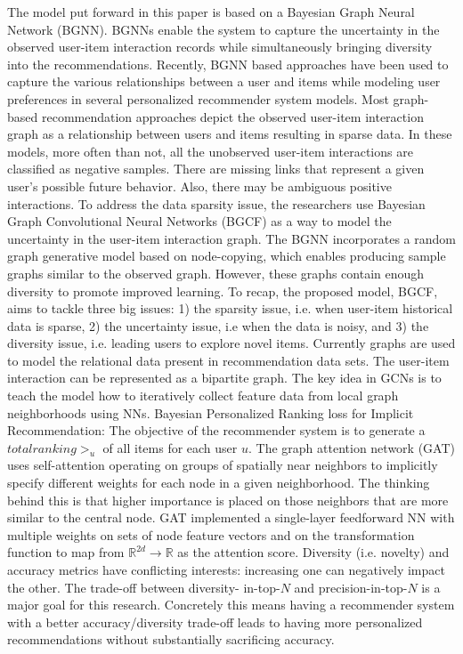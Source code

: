 The model put forward in this paper is based on a Bayesian Graph Neural Network (BGNN). BGNNs enable the system to capture the uncertainty in the observed user-item interaction records while simultaneously bringing diversity into the recommendations.  Recently, BGNN based approaches have been used to capture the various relationships between a user and items while modeling user preferences in several personalized recommender system models. Most graph-based recommendation approaches depict the observed user-item interaction graph as a relationship between users and items resulting in sparse data. In these models, more often than not, all the unobserved user-item interactions are classified as negative samples. There are missing links that represent a given user’s possible future behavior. Also, there may be ambiguous positive interactions. To address the data sparsity issue, the researchers use Bayesian Graph Convolutional Neural Networks (BGCF) as a way to model the uncertainty in the user-item interaction graph. The BGNN incorporates a random graph generative model based on node-copying, which enables producing sample graphs similar to the observed graph. However, these graphs contain enough diversity to promote improved learning. To recap, the proposed model, BGCF, aims to tackle three big issues: 1) the sparsity issue, i.e. when user-item historical data is sparse, 2) the uncertainty issue, i.e when the data is noisy, and 3) the diversity issue, i.e. leading users to explore novel items. Currently graphs are used to model the relational data present in recommendation data sets. The user-item interaction can be represented as a bipartite graph.  The key idea in GCNs is to teach the model how to iteratively collect feature data from local graph neighborhoods using NNs.  Bayesian Personalized Ranking loss for Implicit Recommendation: The objective of the recommender system is to generate a  $total ranking>_u$ of all items for each user $u$. The graph attention network (GAT) uses self-attention operating on groups of spatially near neighbors to implicitly specify different weights for each node in a given neighborhood. The thinking behind this is that higher importance is placed on those neighbors that are more similar to the central node. GAT implemented a single-layer feedforward NN with multiple weights on sets of node feature vectors and on the transformation function to map from $\mathbb{R}^{2d}\longrightarrow\mathbb{R} $ as the attention score. Diversity (i.e. novelty) and accuracy metrics have conflicting interests: increasing one can negatively impact the other. The trade-off between diversity- in-top-$N$ and precision-in-top-$N$ is a major goal for this research. Concretely this means having a recommender system with a better accuracy/diversity trade-off leads to having more personalized recommendations without substantially sacrificing accuracy.

